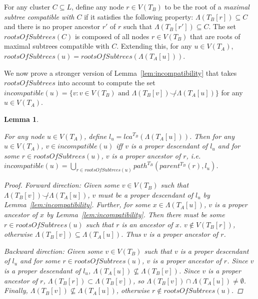 \documentclass{article}
\newcommand{\compatible}{\smile}
\newcommand{\leafset}{\Lambda}
\newtheorem{incompatibilityrootsofsubtrees}[incompatibility]{Lemma}
\begin{document}
    For any cluster $C \subseteq L$, define any node $r \in V(T_B)$ to be the root of a \textit{maximal subtree compatible with $C$} if it satisfies the following property: $\leafset(T_B[r]) \subseteq C$ and there is no proper ancestor $r'$ of $r$ such that $\leafset(T_B[r']) \subseteq C$. The set $rootsOfSubtrees(C)$ is composed of all nodes $r \in V(T_B)$ that are roots of maximal subtrees compatible with $C$. Extending this, for any $u \in V(T_A)$, $rootsOfSubtrees(u) = rootsOfSubtrees(\leafset(T_A[u]))$.

    We now prove a stronger version of Lemma~\ref{lem:incompatibility} that takes $rootsOfSubtrees$ into account to compute the set $incompatible(u) = \{v : v \in V(T_B) \text{ and } \leafset(T_B[v]) \not\compatible \leafset(T_A[u])\}$ for any $u \in V(T_A)$.
    \newline

    \begin{incompatibilityrootsofsubtrees}
        \label{lem:incompatibilityrootsofsubtrees}

        For any node $u \in V(T_A)$, define $l_u = lca^{T_B}(\leafset(T_A[u]))$. Then for any $u \in V(T_A)$, $v \in incompatible(u)$ iff $v$ is a proper descendant of $l_u$ and for some $r \in rootsOfSubtrees(u)$, $v$ is a proper ancestor of $r$, i.e. $incompatible(u) = \bigcup_{r \in rootsOfSubtrees(u)} path^{T_B}(parent^{T_B}(r), l_u)$.

        \begin{proof}
            \textit{Forward direction}: Given some $v \in V(T_B)$ such that $\leafset(T_B[v]) \not\compatible \leafset(T_A[u])$, $v$ must be a proper descendant of $l_u$ by Lemma~\ref{lem:incompatibility}. Further, for some $x \in \leafset(T_A[u])$, $v$ is a proper ancestor of $x$ by Lemma~\ref{lem:incompatibility}. Then there must be some $r \in rootsOfSubtrees(u)$ such that $r$ is an ancestor of $x$. $v \not\in V(T_B[r])$, otherwise $\leafset(T_B[v]) \subseteq \leafset(T_A[u])$. Thus $v$ is a proper ancestor of $r$.

            \textit{Backward direction}: Given some $v \in V(T_B)$ such that $v$ is a proper descendant of $l_u$ and for some $r \in rootsOfSubtrees(u)$, $v$ is a proper ancestor of $r$. Since $v$ is a proper descendant of $l_u$, $\leafset(T_A[u]) \not\subseteq \leafset(T_B[v])$. Since $v$ is a proper ancestor of $r$, $\leafset(T_B[r]) \subset \leafset(T_B[v])$, so $\leafset(T_B[v]) \cap \leafset(T_A[u]) \neq \emptyset$. Finally, $\leafset(T_B[v]) \not\subseteq \leafset(T_A[u])$, otherwise $r \not\in rootsOfSubtrees(u)$.
        \end{proof}
    \end{incompatibilityrootsofsubtrees}
\end{document}
